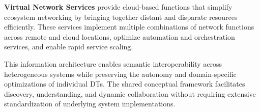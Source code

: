 \textbf{Virtual Network Services} provide cloud-based functions that simplify ecosystem networking
    by bringing together distant and disparate resources efficiently.
These services implement multiple combinations of network functions across remote and cloud locations,
    optimize automation and orchestration services, and enable rapid service scaling.

This information architecture enables semantic interoperability across heterogeneous systems
    while preserving the autonomy and domain-specific optimizations of individual DTs.
The shared conceptual framework facilitates discovery, understanding, and dynamic collaboration
    without requiring extensive standardization of underlying system implementations.







